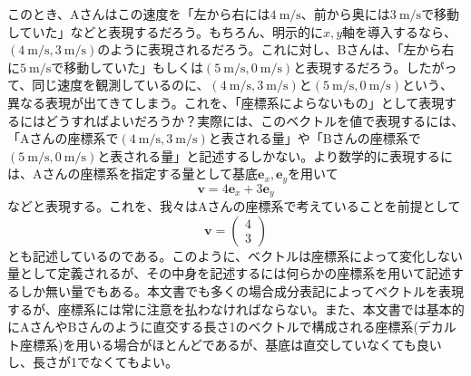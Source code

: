 このとき、Aさんはこの速度を「左から右には\(4 \ \mathrm{m/s}\)、前から奥には\(3 \ \mathrm{m/s}\)で移動していた」などと表現するだろう。もちろん、明示的に\(x,y\)軸を導入するなら、\((4 \ \mathrm{m/s},3 \ \mathrm{m/s})\)のように表現されるだろう。これに対し、Bさんは、「左から右に\(5 \ \mathrm{m/s}\)で移動していた」もしくは\((5 \ \mathrm{m/s},0 \ \mathrm{m/s})\)と表現するだろう。したがって、同じ速度を観測しているのに、\((4 \ \mathrm{m/s},3 \ \mathrm{m/s})\)と\((5 \ \mathrm{m/s},0 \ \mathrm{m/s})\)という、異なる表現が出てきてしまう。これを、「座標系によらないもの」として表現するにはどうすればよいだろうか？実際には、このベクトルを値で表現するには、「Aさんの座標系で\((4 \ \mathrm{m/s},3 \ \mathrm{m/s})\)と表される量」や「Bさんの座標系で\((5 \ \mathrm{m/s},0 \ \mathrm{m/s})\)と表される量」と記述するしかない。より数学的に表現するには、Aさんの座標系を指定する量として基底\(\boldsymbol{e}_x,\boldsymbol{e}_y\)を用いて
\begin{equation}
	\boldsymbol{v}= 4\boldsymbol{e}_x+3\boldsymbol{e}_y
\end{equation}
などと表現する。これを、我々はAさんの座標系で考えていることを前提として
\begin{equation}
	\boldsymbol{v}= \begin{pmatrix} 4 \\ 3 \end{pmatrix}
\end{equation}
とも記述しているのである。このように、ベクトルは座標系によって変化しない量として定義されるが、その中身を記述するには何らかの座標系を用いて記述するしか無い量でもある。本文書でも多くの場合成分表記によってベクトルを表現するが、座標系には常に注意を払わなければならない。また、本文書では基本的にAさんやBさんのように直交する長さ1のベクトルで構成される座標系(デカルト座標系)を用いる場合がほとんどであるが、基底は直交していなくても良いし、長さが1でなくてもよい。

